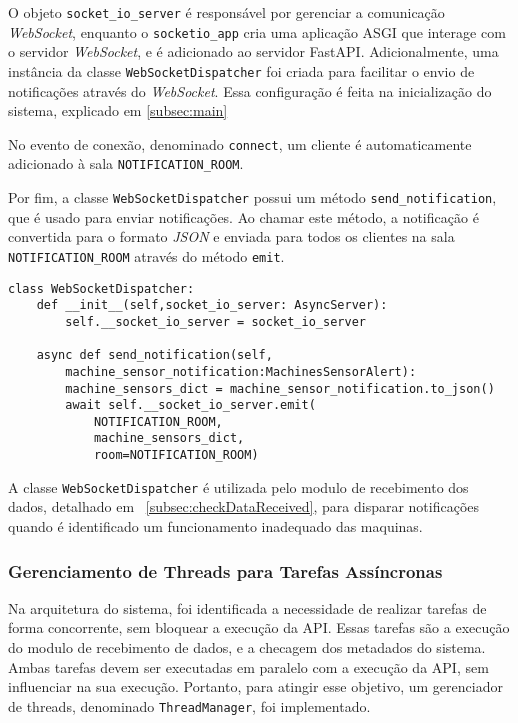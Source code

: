 O objeto \texttt{socket\_io\_server} é responsável por gerenciar a comunicação \textit{WebSocket}, enquanto o \texttt{socketio\_app} cria uma aplicação \gls{ASGI} que interage com o servidor \textit{WebSocket}, e é adicionado ao servidor FastAPI. Adicionalmente, uma instância da classe \texttt{WebSocketDispatcher} foi criada para facilitar o envio de notificações através do \textit{WebSocket}. Essa configuração é feita na inicialização do sistema, explicado em \ref{subsec:main}

No evento de conexão, denominado \texttt{connect}, um cliente é automaticamente adicionado à sala \texttt{NOTIFICATION\_ROOM}.

Por fim, a classe \texttt{WebSocketDispatcher} possui um método \texttt{send\_notification}, que é usado para enviar notificações. Ao chamar este método, a notificação é convertida para o formato \textit{JSON} e enviada para todos os clientes na sala \texttt{NOTIFICATION\_ROOM} através do método \texttt{emit}.

\begin{verbatim}
class WebSocketDispatcher:
    def __init__(self,socket_io_server: AsyncServer):
        self.__socket_io_server = socket_io_server
    
    async def send_notification(self,
        machine_sensor_notification:MachinesSensorAlert):
        machine_sensors_dict = machine_sensor_notification.to_json()
        await self.__socket_io_server.emit(
            NOTIFICATION_ROOM,
            machine_sensors_dict,
            room=NOTIFICATION_ROOM)
\end{verbatim}

A classe \texttt{WebSocketDispatcher} é utilizada pelo modulo de recebimento dos dados, detalhado em ~\ref{subsec:checkDataReceived}, para disparar notificações quando é identificado um funcionamento inadequado das maquinas.


\subsubsection{Gerenciamento de Threads para Tarefas Assíncronas}\label{subsubsec:ThreadManager}

Na arquitetura do sistema, foi identificada a necessidade de realizar tarefas de forma concorrente, sem bloquear a execução da \gls{API}. Essas tarefas são a execução do modulo de recebimento de dados, e a checagem dos metadados do sistema. Ambas tarefas devem ser executadas em paralelo com a execução da \gls{API}, sem influenciar na sua execução. Portanto, para atingir esse objetivo, um gerenciador de threads, denominado \texttt{ThreadManager}, foi implementado.

